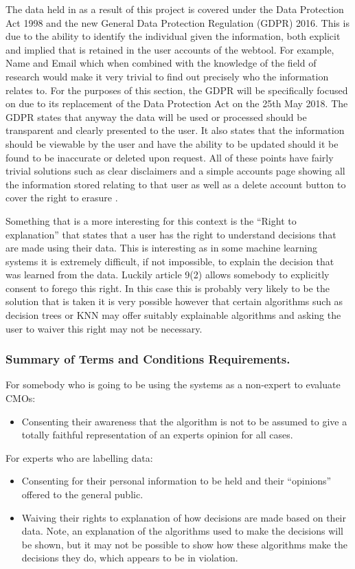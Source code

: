 \documentclass{ecmm427_assignment}
\begin{document}
 The data held in as a result of this project is covered
under the Data Protection Act 1998 and the new General Data Protection
Regulation (GDPR) 2016. This is due to the ability to identify the individual
given the information, both explicit and implied that is retained in
the user accounts of the webtool. For example, Name and Email which when combined
with the knowledge of the field of research would make it very trivial
to find out precisely who the information relates to. For the purposes
of this section, the GDPR will be specifically focused on due to its
replacement of the Data Protection Act on the 25th May 2018. The GDPR
states that anyway the data will be used or processed should be
transparent and clearly presented to the user. It also states that
the information should be viewable by the user and have the ability
to be updated should it be found to be inaccurate or deleted upon
request. All of these points have fairly trivial solutions such as
clear disclaimers and a simple accounts page showing all the information
stored relating to that user as well as a delete account button to
cover the right to erasure \cite{eu:gdpr}. 

 Something that is a more interesting for this context is the ``Right
to explanation'' that states that a user has the right to understand decisions that are made using their data. This is interesting
as in some machine learning systems it is extremely difficult, if
not impossible, to explain the decision that was learned from the
data. Luckily article 9(2) allows somebody to explicitly consent
to forego this right. In this case this is probably very likely to
be the solution that is taken it is very possible however that certain
algorithms such as decision trees or KNN may offer suitably explainable
algorithms and asking the user to waiver this right may not be necessary. 

\subsubsection{Summary of Terms and Conditions Requirements.}

For somebody who is going to be using the systems as a non-expert
to evaluate CMOs:
\begin{itemize}
\item Consenting their awareness that the algorithm is not to be assumed
to give a totally faithful representation of an experts opinion for
all cases.
\end{itemize}
For experts who are labelling data:
\begin{itemize}
\item Consenting for their personal information to be held and their ``opinions''
offered to the general public.
\item Waiving their rights to explanation of how decisions are made based
on their data. Note, an explanation of the algorithms used to make
the decisions will be shown, but it may not be possible to show how
these algorithms make the decisions they do, which appears to be in
violation.
\end{itemize}
\end{document}
